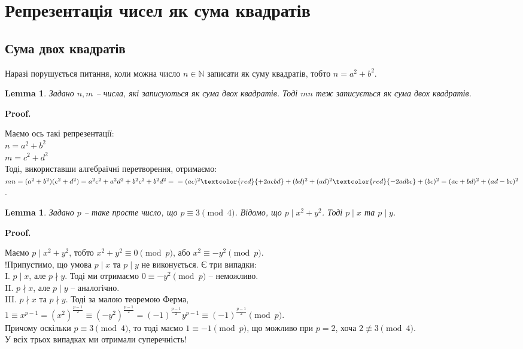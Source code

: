 \documentclass[a4paper, 14pt]{extarticle}
\makeatletter
\theoremstyle{theoremdd}
\theoremstyle{theoremdd}
\theoremstyle{theoremdd}
\theoremstyle{theoremdd}
\theoremstyle{theoremdd}
\theoremstyle{theoremdd}
\theoremstyle{theoremdd}
\newtheorem{lemma}[theorem]{Lemma}
\theoremstyle{theoremdd}
\def\qed{$\blacksquare$}
\renewenvironment{proof}[1][Proof.\\]{\par
\pushQED{\hfill \qed}%
\normalfont \topsep6\p@\@plus6\p@\relax
\trivlist
\item\relax
{\bfseries
#1\@addpunct{.}}\hspace\labelsep\ignorespaces
}{%
\popQED\endtrivlist\@endpefalse
}
\makeatother
\begin{document}
\section{Репрезентація чисел як сума квадратів}
\subsection{Сума двох квадратів}
Наразі порушується питання, коли можна число $n \in \mathbb{N}$ записати як суму квадратів, тобто $n = a^2+b^2$.

\begin{lemma}
Задано $n,m$ -- числа, які записуються як сума двох квадратів. Тоді $mn$ теж записується як сума двох квадратів.
\end{lemma}

\begin{proof}
Маємо ось такі репрезентації:\\
$n = a^2+b^2$\\
$m = c^2+d^2$\\
Тоді, використавши алгебраїчні перетворення, отримаємо:\\
$mn = (a^2+b^2)(c^2+d^2) = a^2c^2+a^2d^2+b^2c^2+b^2d^2 = \\
= (ac)^2 \textcolor{red}{+ 2acbd} + (bd)^2 + (ad)^2 \textcolor{red}{-2adbc} + (bc)^2 = (ac+bd)^2 + (ad-bc)^2$.
\end{proof}

\begin{lemma}
Задано $p$ -- таке просте число, що $p \equiv 3 \pmod 4$. Відомо, що $p \mid x^2+y^2$. Тоді $p \mid x$ та $p \mid y$.
\end{lemma}

\begin{proof}
Маємо $p \mid x^2+y^2$, тобто $x^2 + y^2 \equiv 0 \pmod p$, або $x^2 \equiv -y^2 \pmod p$.\\
!Припустимо, що умова $p \mid x$ та $p \mid y$ не виконується. Є три випадки:\\ 
I. $p \mid x$, але $p \nmid y$. Тоді ми отримаємо $0 \equiv -y^2 \pmod p$ -- неможливо.\\
II. $p \nmid x$, але $p \mid y$ -- аналогічно.\\
III. $p \nmid x$ та $p \nmid y$. Тоді за малою теоремою Ферма,\\
$1 \equiv x^{p-1} = \left(x^2\right)^{\textstyle\frac{p-1}{2}} \equiv \left(-y^2\right)^{\textstyle\frac{p-1}{2}} = (-1)^{\textstyle\frac{p-1}{2}}y^{p-1} \equiv (-1)^{\textstyle\frac{p-1}{2}} \pmod p$.\\
Причому оскільки $p \equiv 3 \pmod 4$, то тоді маємо $1 \equiv - 1 \pmod p$, що можливо при $p = 2$, хоча $2 \not\equiv 3 \pmod 4$.\\
У всіх трьох випадках ми отримали суперечність!
\end{proof}
\end{document}

